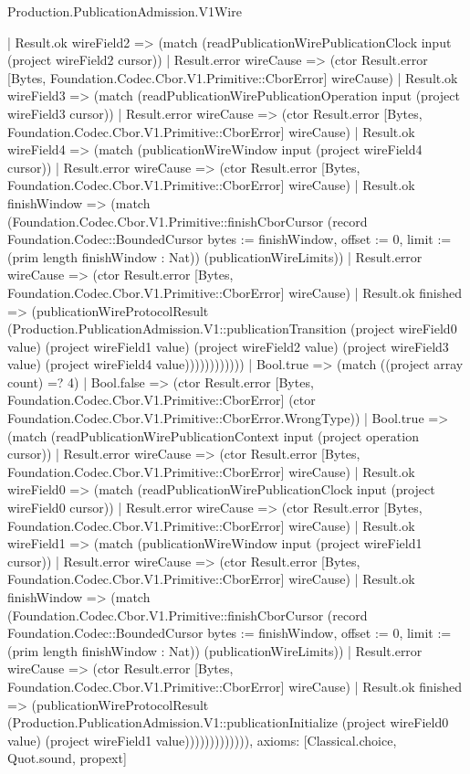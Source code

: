 \begin{lexlean}{Production.PublicationAdmission.V1Wire}
\begin{semanticmodule}
{                      | Result.ok wireField2 => (match (readPublicationWirePublicationClock input (project wireField2 cursor))
                        | Result.error wireCause => (ctor Result.error [Bytes, Foundation.Codec.Cbor.V1.Primitive::CborError] wireCause)
                        | Result.ok wireField3 => (match (readPublicationWirePublicationOperation input (project wireField3 cursor))
                          | Result.error wireCause => (ctor Result.error [Bytes, Foundation.Codec.Cbor.V1.Primitive::CborError] wireCause)
                          | Result.ok wireField4 => (match (publicationWireWindow input (project wireField4 cursor))
                            | Result.error wireCause => (ctor Result.error [Bytes, Foundation.Codec.Cbor.V1.Primitive::CborError] wireCause)
                            | Result.ok finishWindow => (match (Foundation.Codec.Cbor.V1.Primitive::finishCborCursor (record Foundation.Codec::BoundedCursor {bytes := finishWindow, offset := 0, limit := (prim length finishWindow : Nat)}) (publicationWireLimits))
                              | Result.error wireCause => (ctor Result.error [Bytes, Foundation.Codec.Cbor.V1.Primitive::CborError] wireCause)
                              | Result.ok finished => (publicationWireProtocolResult (Production.PublicationAdmission.V1::publicationTransition (project wireField0 value) (project wireField1 value) (project wireField2 value) (project wireField3 value) (project wireField4 value))))))))))))
            | Bool.true => (match ((project array count) =? 4)
              | Bool.false => (ctor Result.error [Bytes, Foundation.Codec.Cbor.V1.Primitive::CborError] (ctor Foundation.Codec.Cbor.V1.Primitive::CborError.WrongType))
              | Bool.true => (match (readPublicationWirePublicationContext input (project operation cursor))
                | Result.error wireCause => (ctor Result.error [Bytes, Foundation.Codec.Cbor.V1.Primitive::CborError] wireCause)
                | Result.ok wireField0 => (match (readPublicationWirePublicationClock input (project wireField0 cursor))
                  | Result.error wireCause => (ctor Result.error [Bytes, Foundation.Codec.Cbor.V1.Primitive::CborError] wireCause)
                  | Result.ok wireField1 => (match (publicationWireWindow input (project wireField1 cursor))
                    | Result.error wireCause => (ctor Result.error [Bytes, Foundation.Codec.Cbor.V1.Primitive::CborError] wireCause)
                    | Result.ok finishWindow => (match (Foundation.Codec.Cbor.V1.Primitive::finishCborCursor (record Foundation.Codec::BoundedCursor {bytes := finishWindow, offset := 0, limit := (prim length finishWindow : Nat)}) (publicationWireLimits))
                      | Result.error wireCause => (ctor Result.error [Bytes, Foundation.Codec.Cbor.V1.Primitive::CborError] wireCause)
                      | Result.ok finished => (publicationWireProtocolResult (Production.PublicationAdmission.V1::publicationInitialize (project wireField0 value) (project wireField1 value))))))))))))),
  axioms: [Classical.choice, Quot.sound, propext]
}


\end{semanticmodule}
\end{lexlean}
